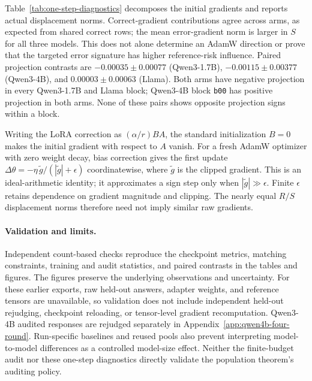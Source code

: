 Table~\ref{tab:one-step-diagnostics} decomposes the initial gradients
and reports actual displacement norms. Correct-gradient contributions
agree across arms, as expected from shared correct rows; the mean
error-gradient norm is larger in $S$ for all three models. This does not
alone determine an AdamW direction or prove that the targeted error
signature has higher reference-risk influence. Paired projection
contrasts are $-0.00035\pm0.00077$ (Qwen3-1.7B),
$-0.00115\pm0.00377$ (Qwen3-4B), and $0.00003\pm0.00063$ (Llama).
Both arms have negative projection in every
Qwen3-1.7B and Llama block; Qwen3-4B block \texttt{b00} has positive
projection in both arms. None of these pairs shows opposite projection
signs within a block.

Writing the LoRA correction as $(\alpha/r)BA$, the standard initialization
$B=0$ makes the initial gradient with respect to $A$ vanish.
For a fresh AdamW optimizer with zero weight
decay, bias correction gives the first update
$\Delta\theta=-\eta\,\widetilde g/(|\widetilde g|+\epsilon)$
coordinatewise, where $\widetilde g$ is the clipped gradient.
This is an ideal-arithmetic identity; it approximates a sign step only
when $|\widetilde g|\gg\epsilon$. Finite $\epsilon$ retains dependence
on gradient magnitude and clipping. The nearly equal $R/S$ displacement
norms therefore need not imply similar raw gradients.








\paragraph{Validation and limits.}
Independent count-based checks reproduce the checkpoint metrics,
matching constraints, training and audit statistics, and paired contrasts
in the tables and figures. The figures preserve the underlying
observations and uncertainty. For these earlier exports, raw held-out answers,
adapter weights, and reference tensors are unavailable, so validation does
not include independent held-out rejudging, checkpoint reloading,
or tensor-level gradient recomputation. Qwen3-4B audited responses are
rejudged separately in Appendix~\ref{app:qwen4b-four-round}.
Run-specific baselines and reused
pools also prevent interpreting model-to-model differences as a controlled
model-size effect. Neither the finite-budget audit nor these one-step
diagnostics directly validate the population theorem's auditing policy.
